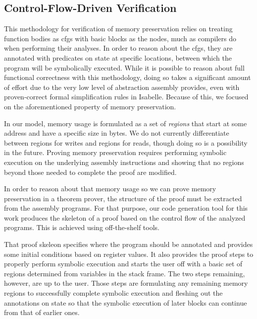 \subsection{Control-Flow-Driven Verification}
This methodology for verification of memory preservation relies on treating function bodies
as \acp{cfg} with basic blocks as the nodes,
much as compilers do when performing their analyses.
In order to reason about the \acp{cfg},
they are annotated with predicates on state at specific locations,
between which the program will be symbolically executed.
While it is possible to reason about full functional correctness with this methodology,
doing so takes a significant amount of effort due to the very low level of abstraction
assembly provides, even with proven-correct formal simplification rules in Isabelle.
Because of this, we focused on the aforementioned property of memory preservation.

In our model, memory usage is formulated as a set of \emph{regions}
that start at some address and have a specific size in bytes.
We do not currently differentiate between regions for writes and regions for reads,
though doing so is a possibility in the future.
Proving memory preservation requires performing symbolic execution
on the underlying assembly instructions
and showing that no regions beyond those needed to complete the proof are modified.

In order to reason about that memory usage
so we can prove memory preservation in a theorem prover,
the structure of the proof must be extracted from the assembly programs.
For that purpose,
our code generation tool for this work produces the skeleton of a proof
based on the control flow of the analyzed programs.
This is achieved using off-the-shelf tools.

That proof skeleon specifies where the program should be annotated
and provides some initial conditions based on register values.
It also provides the proof steps to properly perform symbolic execution
and starts the user off with a basic set of regions
determined from variables in the stack frame.
The two steps remaining, however, are up to the user.
Those steps are formulating any remaining memory regions
to successfully complete symbolic execution
and fleshing out the annotations on state so that the symbolic execution of later blocks
can continue from that of earlier ones.

